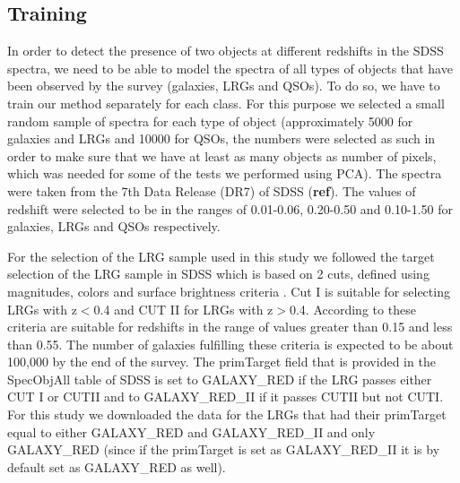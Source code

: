 \documentclass[12pt,preprint]{aastex}
\begin{document}
\subsection{Training}\label{sec:training}
In order to detect the presence of two objects at different redshifts
in the SDSS spectra, we need to be able to model the spectra of all
types of objects that have been observed by the survey (galaxies, LRGs
and QSOs). To do so, we have to train our method separately for each
class. For this purpose we selected a small random sample of spectra
for each type of object (approximately 5000 for galaxies and LRGs and
10000 for QSOs, the numbers were selected as such in order to make
sure that we have at least as many objects as number of pixels, which
was needed for some of the tests we performed using PCA). The spectra
were taken from the 7th Data Release (DR7) of SDSS (\textbf{ref}). The
values of redshift were selected to be in the ranges of 0.01-0.06,
0.20-0.50 and 0.10-1.50 for galaxies, LRGs and QSOs respectively.

For the selection of the LRG sample used in this study we followed the
target selection of the LRG sample in SDSS which is based on 2 cuts,
defined using magnitudes, colors and surface brightness criteria
\citep{eisenstein}. Cut I is suitable for selecting LRGs with z$<$0.4
and CUT II for LRGs with z$>$0.4. According to \cite{eisenstein} these
criteria are suitable for redshifts in the range of values greater
than 0.15 and less than 0.55. The number of galaxies fulfilling these
criteria is expected to be about 100,000 by the end of the survey. The
primTarget field that is provided in the SpecObjAll table of SDSS is
set to GALAXY\_RED if the LRG passes either CUT I or CUTII and to
GALAXY\_RED\_II if it passes CUTII but not CUTI. For this study we
downloaded the data for the LRGs that had their primTarget equal to
either GALAXY\_RED and GALAXY\_RED\_II and only GALAXY\_RED (since if
the primTarget is set as GALAXY\_RED\_II it is by default set as
GALAXY\_RED as well).
\end{document}

